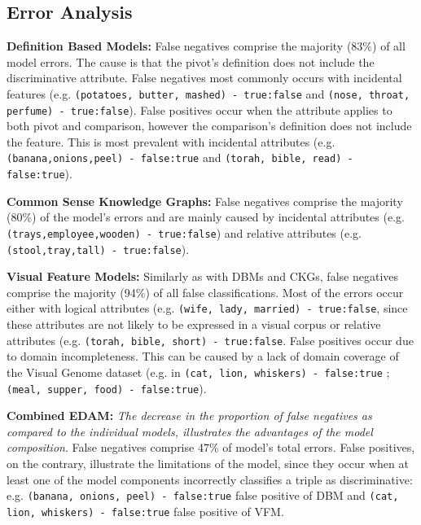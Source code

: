 \documentclass[11pt,a4paper]{article}
\begin{document}
\subsection{Error Analysis}

\noindent \textbf{Definition Based Models:} False negatives comprise the majority (83\%) of all model errors. The cause is that the pivot's definition does not include the discriminative attribute. False negatives most commonly occurs with incidental features (e.g. \texttt{(potatoes, butter, mashed) - true:false} and \texttt{(nose, throat, perfume) - true:false}). False positives occur when the attribute applies to both pivot and comparison, however the comparison's definition does not include the feature. This is most prevalent with incidental attributes (e.g. \texttt{(banana,onions,peel) - false:true} and \texttt{(torah, bible, read) - false:true}).

\noindent \textbf{Common Sense Knowledge Graphs:} False negatives comprise the majority (80\%) of the model's errors and are mainly caused by incidental attributes (e.g. \texttt{(trays,employee,wooden) - true:false}) and relative attributes (e.g. \texttt{(stool,tray,tall) - true:false}).

\noindent \textbf{Visual Feature Models:} Similarly as with DBMs and CKGs, false negatives comprise the majority (94\%) of all false classifications. Most of the errors occur either with logical attributes (e.g. \texttt{(wife, lady, married) - true:false}, since these attributes are not likely to be expressed in a visual corpus or relative attributes (e.g. \texttt{(torah, bible, short) - true:false}. False positives occur due to domain incompleteness. This can be caused by a lack of domain coverage of the Visual Genome dataset (e.g. in \texttt{(cat, lion, whiskers) - false:true} ; \texttt{(meal, supper, food) - false:true}).



\noindent \textbf{Combined EDAM:} \textit{The decrease in the proportion of false negatives as compared to the individual models, illustrates the advantages of the model composition}. False negatives comprise 47\% of model's total errors. False positives, on the contrary, illustrate the limitations of the model, since they occur when at least one of the model components incorrectly classifies a triple as discriminative: e.g. \texttt{(banana, onions, peel) - false:true} false positive of DBM and \texttt{(cat, lion, whiskers) - false:true} false positive of VFM.
\end{document}

